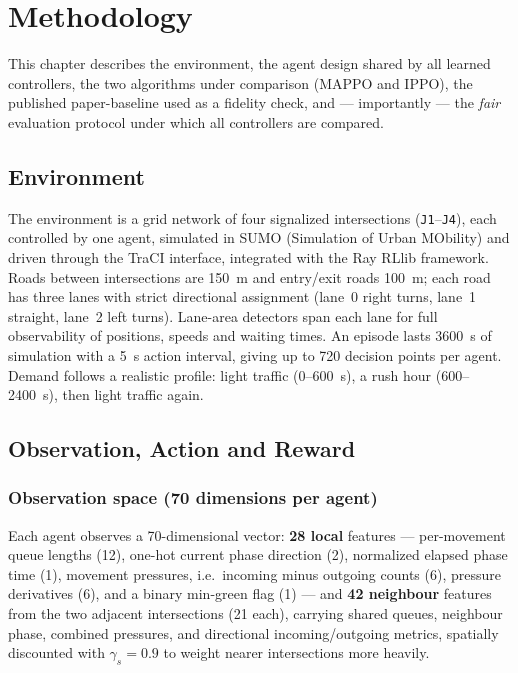 \chapter{Methodology}
\label{ch:methodology}

This chapter describes the environment, the agent design shared by all learned
controllers, the two algorithms under comparison (MAPPO and IPPO), the published
paper-baseline used as a fidelity check, and --- importantly --- the \emph{fair}
evaluation protocol under which all controllers are compared.

\section{Environment}
The environment is a  grid network of four signalized intersections
(\texttt{J1}--\texttt{J4}), each controlled by one agent, simulated in SUMO
(Simulation of Urban MObility) and driven through the TraCI interface, integrated
with the Ray RLlib framework. Roads between intersections are \SI{150}{\metre} and
entry/exit roads \SI{100}{\metre}; each road has three lanes with strict
directional assignment (lane~0 right turns, lane~1 straight, lane~2 left turns).
Lane-area detectors span each lane for full observability of positions, speeds and
waiting times. An episode lasts \SI{3600}{\second} of simulation with a
\SI{5}{\second} action interval, giving up to 720 decision points per agent.
Demand follows a realistic profile: light traffic ($0$--\SI{600}{\second}), a rush
hour (\SI{600}{}--\SI{2400}{\second}), then light traffic again.

\section{Observation, Action and Reward}

\subsection{Observation space (70 dimensions per agent)}
Each agent observes a 70-dimensional vector: \textbf{28 local} features ---
per-movement queue lengths (12), one-hot current phase direction (2), normalized
elapsed phase time (1), movement pressures, i.e.\ incoming minus outgoing counts
(6), pressure derivatives (6), and a binary min-green flag (1) --- and \textbf{42
neighbour} features from the two adjacent intersections (21 each), carrying shared
queues, neighbour phase, combined pressures, and directional incoming/outgoing
metrics, spatially discounted with $\gamma_s = 0.9$ to weight nearer intersections
more heavily.

